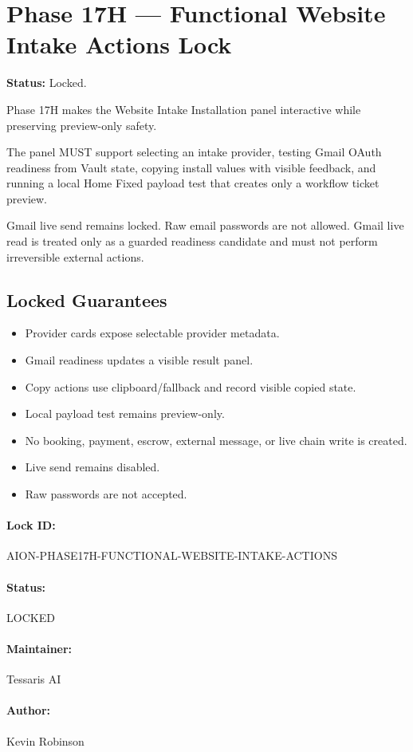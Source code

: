 \section{Phase 17H --- Functional Website Intake Actions Lock}

\textbf{Status:} Locked.

Phase 17H makes the Website Intake Installation panel interactive while preserving preview-only safety.

The panel MUST support selecting an intake provider, testing Gmail OAuth readiness from Vault state, copying install values with visible feedback, and running a local Home Fixed payload test that creates only a workflow ticket preview.

Gmail live send remains locked. Raw email passwords are not allowed. Gmail live read is treated only as a guarded readiness candidate and must not perform irreversible external actions.

\subsection{Locked Guarantees}

\begin{itemize}
  \item Provider cards expose selectable provider metadata.
  \item Gmail readiness updates a visible result panel.
  \item Copy actions use clipboard/fallback and record visible copied state.
  \item Local payload test remains preview-only.
  \item No booking, payment, escrow, external message, or live chain write is created.
  \item Live send remains disabled.
  \item Raw passwords are not accepted.
\end{itemize}

\paragraph{Lock ID:} AION-PHASE17H-FUNCTIONAL-WEBSITE-INTAKE-ACTIONS

\paragraph{Status:} LOCKED

\paragraph{Maintainer:} Tessaris AI

\paragraph{Author:} Kevin Robinson
